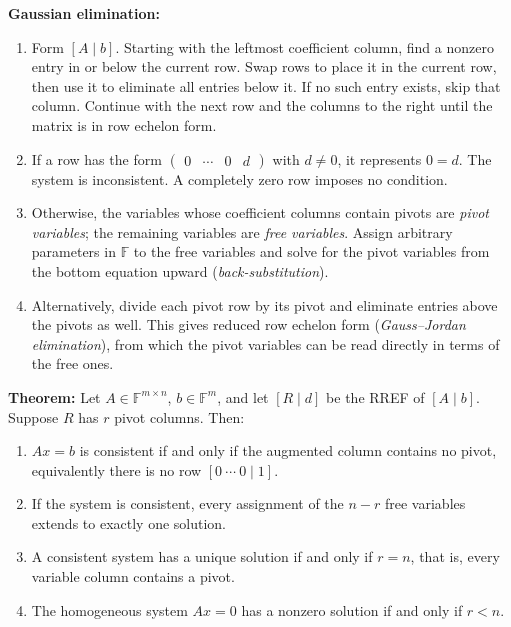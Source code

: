 \documentclass[a4paper,11pt,abstract=true]{scrartcl}
\theoremstyle{dotlessP}
\theoremstyle{dotlessS}
\theoremstyle{remark}
\theoremstyle{definition}
\begin{document}
\begin{claim_box}
\textbf{Gaussian elimination:}
\begin{enumerate}
    \item Form $[A\mid b]$. Starting with the leftmost coefficient
    column, find a nonzero entry in or below the current row. Swap
    rows to place it in the current row, then use it to eliminate all
    entries below it. If no such entry exists, skip that column.
    Continue with the next row and the columns to the right until
    the matrix is in row echelon form.
    \item If a row has the form
    $\left(\begin{array}{ccc|c}0&\cdots&0&d\end{array}\right)$
    with $d\neq0$, it represents $0=d$. The system is inconsistent.
    A completely zero row imposes no condition.
    \item Otherwise, the variables whose coefficient columns contain
    pivots are \emph{pivot variables}; the remaining variables are
    \emph{free variables}. Assign arbitrary parameters in $\mathbb{F}$
    to the free variables and solve for the pivot variables from the
    bottom equation upward (\emph{back-substitution}).
    \item Alternatively, divide each pivot row by its pivot and
    eliminate entries above the pivots as well. This gives reduced
    row echelon form (\emph{Gauss--Jordan elimination}), from which
    the pivot variables can be read directly in terms of the free ones.
\end{enumerate}
\end{claim_box}

\begin{problem_box}
\textbf{Theorem:}
Let
$A\in\mathbb{F}^{m\times n}$, $b\in\mathbb{F}^m$, and let
$[R\mid d]$ be the RREF of $[A\mid b]$. Suppose $R$ has $r$ pivot
columns. Then:
\begin{enumerate}
    \item $Ax=b$ is consistent if and only if the augmented column
    contains no pivot, equivalently there is no row $[0\ \cdots\ 0\mid1]$.
    \item If the system is consistent, every assignment of the $n-r$
    free variables extends to exactly one solution.
    \item A consistent system has a unique solution if and only if
    $r=n$, that is, every variable column contains a pivot.
    \item The homogeneous system $Ax=0$ has a nonzero solution if and
    only if $r<n$.
\end{enumerate}
\end{problem_box}
\end{document}
